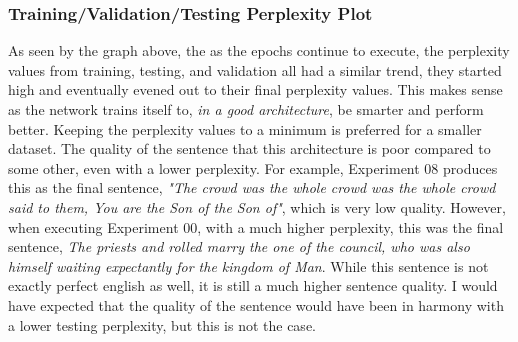 \documentclass[a4paper]{article}
\begin{document}
\subsubsection{Training/Validation/Testing Perplexity Plot}
\begin{center}
\end{center}

As seen by the graph above, the as the epochs continue to execute, the perplexity values from training, testing, and validation all had a similar trend, they started high and eventually evened out to their final perplexity values. This makes sense as the network trains itself to, \textit{in a good architecture}, be smarter and perform better. Keeping the perplexity values to a minimum is preferred for a smaller dataset. The  quality of the sentence that this architecture is poor compared to some other, even with a lower perplexity. For example, Experiment 08 produces this as the final sentence, \textit{"The crowd was the whole crowd was the whole crowd said to them, You are the Son of the Son of"}, which is very low quality. However, when executing Experiment 00, with a much higher perplexity, this was the final sentence, \textit{The priests and rolled marry the one of the council, who was also himself waiting expectantly for the kingdom of Man}. While this sentence is not exactly perfect english as well, it is still a much higher sentence quality. I would have expected that the quality of the sentence would have been in harmony with a lower testing perplexity, but this is not the case.
\end{document}
